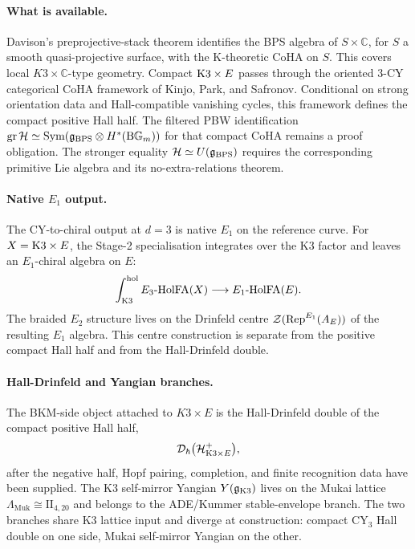 \paragraph{What is available.}
Davison's preprojective-stack theorem identifies the BPS algebra of
$S\times\mathbb{C}$, for $S$ a smooth quasi-projective surface, with the
K-theoretic CoHA on $S$. This covers local $K3\times\mathbb{C}$-type
geometry. Compact $\mathrm{K}3\times E$ passes through the oriented 3-CY
categorical CoHA framework of Kinjo, Park, and Safronov. Conditional on
strong orientation data and Hall-compatible vanishing cycles, this
framework defines the compact positive Hall half. The filtered PBW
identification $\operatorname{gr}\mathcal{H}\simeq
\operatorname{Sym}(\mathfrak{g}_{\mathrm{BPS}}\otimes H^*(\mathrm{B}\mathbb G_m))$ for that
compact CoHA remains a proof obligation. The stronger equality
$\mathcal{H}\simeq U(\mathfrak{g}_{\mathrm{BPS}})$ requires the corresponding primitive Lie algebra
and its no-extra-relations theorem.

\paragraph{Native $E_1$ output.}
The CY-to-chiral output at $d=3$ is native $E_1$ on the reference curve.
For $X=\mathrm{K}3\times E$, the Stage-2 specialisation integrates over the K3
factor and leaves an $E_1$-chiral algebra on $E$:
\[
 \int_{\mathrm{K}3}^{\mathrm{hol}} E_3\text{-HolFA}(X)
   \longrightarrow E_1\text{-HolFA}(E).
\]
The braided $E_2$ structure lives on the Drinfeld centre
$\mathcal{Z}(\operatorname{Rep}^{E_1}(A_E))$ of the resulting $E_1$ algebra. This centre
construction is separate from the positive compact Hall half and from the
Hall-Drinfeld double.

\paragraph{Hall-Drinfeld and Yangian branches.}
The BKM-side object attached to $K3\times E$ is the Hall-Drinfeld double
of the compact positive Hall half,
\[
  \mathcal{D}_\hbar\bigl(\mathcal{H}^+_{\mathrm{K}3\times E}\bigr),
\]
after the negative half, Hopf pairing, completion, and finite recognition
data have been supplied. The K3 self-mirror Yangian
$Y(\mathfrak{g}_{\mathrm{K}3})$ lives on the Mukai lattice
$\Lambda_{\mathrm{Muk}}\cong \mathrm{II}_{4,20}$ and belongs to the
ADE/Kummer stable-envelope branch. The two branches share K3 lattice
input and diverge at construction: compact CY$_3$ Hall double on one
side, Mukai self-mirror Yangian on the other.

